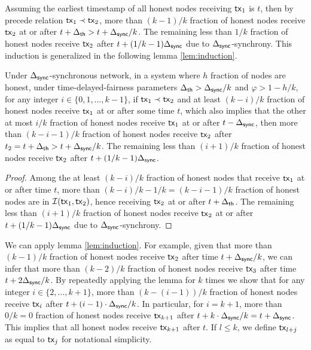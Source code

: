 

Assuming the earliest timestamp of all honest nodes receiving $\mathsf{tx}_1$ is $t$, then by precede relation $\mathsf{tx}_1\prec\mathsf{tx}_2$, more than $(k-1)/k$ fraction of honest nodes receive $\mathsf{tx}_2$ at or after $t+\Delta_{\mathsf{th}}>t+\Delta_{\mathsf{sync}}/k$. The remaining less than $1/k$ fraction of honest nodes receive $\mathsf{tx}_2$ after $t+(1/k-1)\Delta_{\mathsf{sync}}$ due to $\Delta_{\mathsf{sync}}$-synchrony. This induction is generalized in the following lemma \ref{lem:induction}. 

\begin{lemma}\label{lem:induction}
    Under $\Delta_{\mathsf{sync}}$-synchronous network, in a system  where $h$ fraction of nodes are honest, under time-delayed-fairness parameters $\Delta_{\mathsf{th}}>\Delta_{\mathsf{sync}}/k$ and $\varphi > 1-h/k$, for any integer $i\in \{0,1,\dots, k-1\}$, if $\mathsf{tx}_{1}\prec \mathsf{tx}_{2}$ and at least $(k-i)/k$ fraction of honest nodes receive $\mathsf{tx}_1$ at or after some time $t$, which also implies that the other at most $i/k$ fraction of honest nodes receive $\mathsf{tx}_1$ at or after $t-\Delta_{\mathsf{sync}}$, then more than $(k-i-1)/k$ fraction of honest nodes receive $\mathsf{tx}_{2}$ after $t_{2}=t+\Delta_{\mathsf{th}}>t+\Delta_{\mathsf{sync}}/k$. The remaining less than $(i+1)/k$ fraction of honest nodes receive $\mathsf{tx}_{2}$ after $t+(1/k-1)\Delta_{\mathsf{sync}}$.
\end{lemma}

\begin{proof}
    Among the at least $(k-i)/k$ fraction of honest nodes that receive $\mathsf{tx}_1$ at or after time $t$,  more than $(k-i)/k-1/k=(k-i-1)/k$ fraction of honest nodes are in $\mathcal{I}(\mathsf{tx}_1, \mathsf{tx}_2)$, hence receiving $\mathsf{tx}_2$ at or after $t+\Delta_{\mathsf{th}}$. The remaining less than $(i+1)/k$ fraction of honest nodes receive $\mathsf{tx}_2$ at or after $t+(1/k-1)\Delta_{\mathsf{sync}}$ due to $\Delta_{\mathsf{sync}}$-synchrony. 
\end{proof}

We can apply lemma \ref{lem:induction}. For example, given that more than $(k-1)/k$ fraction of honest nodes receive $\mathsf{tx}_2$ after time $t+\Delta_{\mathsf{sync}}/k$, we can infer that more than $(k-2)/k$ fraction of honest nodes receive $\mathsf{tx}_3$ after time $t+2\Delta_{\mathsf{sync}}/k$.  By repeatedly applying the lemma for $k$ times we show that for any integer $i\in \{2,\dots, k+1\}$, more than $(k-(i-1))/k$ fraction of honest nodes receive $\mathsf{tx}_i$ after $t+(i-1)\cdot\Delta_{\mathsf{sync}}/k$. In particular, for $i=k+1$, more than $0/k=0$ fraction of honest nodes receive $\mathsf{tx}_{k+1}$ after $t+k\cdot \Delta_{\mathsf{sync}}/k=t+\Delta_{\mathsf{sync}}$. This implies that all honest nodes receive $\mathsf{tx}_{k+1}$ after $t$. If $l\le k$, we define $\mathsf{tx}_{l+j}$ as equal to $\mathsf{tx}_{j}$ for notational simplicity.

